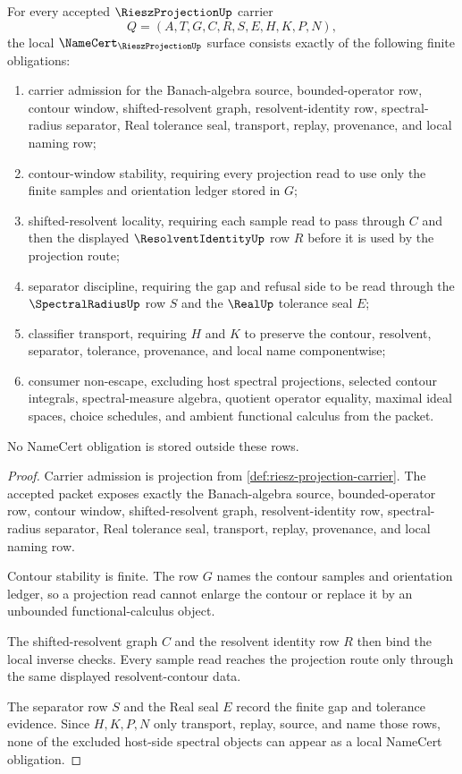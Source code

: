 \begin{theorem}
\label{thm:riesz-projection-namecert-obligations}
For every accepted $\RieszProjectionUp$ carrier
$$
Q=(A,T,G,C,R,S,E,H,K,P,N),
$$
the local $\NameCert_{\RieszProjectionUp}$ surface consists exactly of the following finite obligations:
\begin{enumerate}
\item carrier admission for the Banach-algebra source, bounded-operator row, contour window, shifted-resolvent graph, resolvent-identity row, spectral-radius separator, Real tolerance seal, transport, replay, provenance, and local naming row;
\item contour-window stability, requiring every projection read to use only the finite samples and orientation ledger stored in $G$;
\item shifted-resolvent locality, requiring each sample read to pass through $C$ and then the displayed $\ResolventIdentityUp$ row $R$ before it is used by the projection route;
\item separator discipline, requiring the gap and refusal side to be read through the $\SpectralRadiusUp$ row $S$ and the $\RealUp$ tolerance seal $E$;
\item classifier transport, requiring $H$ and $K$ to preserve the contour, resolvent, separator, tolerance, provenance, and local name componentwise;
\item consumer non-escape, excluding host spectral projections, selected contour integrals, spectral-measure algebra, quotient operator equality, maximal ideal spaces, choice schedules, and ambient functional calculus from the packet.
\end{enumerate}
No NameCert obligation is stored outside these rows.
\end{theorem}
\begin{proof}
Carrier admission is projection from \autoref{def:riesz-projection-carrier}. The accepted packet exposes exactly the Banach-algebra source, bounded-operator row, contour window, shifted-resolvent graph, resolvent-identity row, spectral-radius separator, Real tolerance seal, transport, replay, provenance, and local naming row.

Contour stability is finite. The row $G$ names the contour samples and orientation ledger, so a projection read cannot enlarge the contour or replace it by an unbounded functional-calculus object.

The shifted-resolvent graph $C$ and the resolvent identity row $R$ then bind the local inverse checks. Every sample read reaches the projection route only through the same displayed resolvent-contour data.

The separator row $S$ and the Real seal $E$ record the finite gap and tolerance evidence. Since $H,K,P,N$ only transport, replay, source, and name those rows, none of the excluded host-side spectral objects can appear as a local NameCert obligation.
\end{proof}

